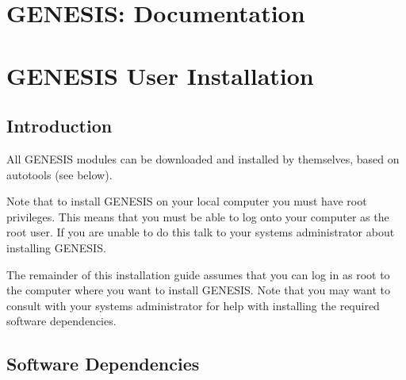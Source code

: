 \documentclass[12pt]{article}
\begin{document}
\section*{GENESIS: Documentation}

\section*{GENESIS User Installation}

\subsection*{Introduction}

All GENESIS modules can be downloaded and installed by themselves, based on autotools (see below). 

Note that to install GENESIS on your local computer you must have root privileges. This means that you must be able to log onto your computer as the root user. If you are unable to do this talk to your systems administrator about installing GENESIS.

The remainder of this installation guide assumes that you can log in as root to the computer where you want to install GENESIS. Note that you may want to consult with your systems administrator for help with installing the required software dependencies. 


\subsection*{Software Dependencies}
\end{document}
